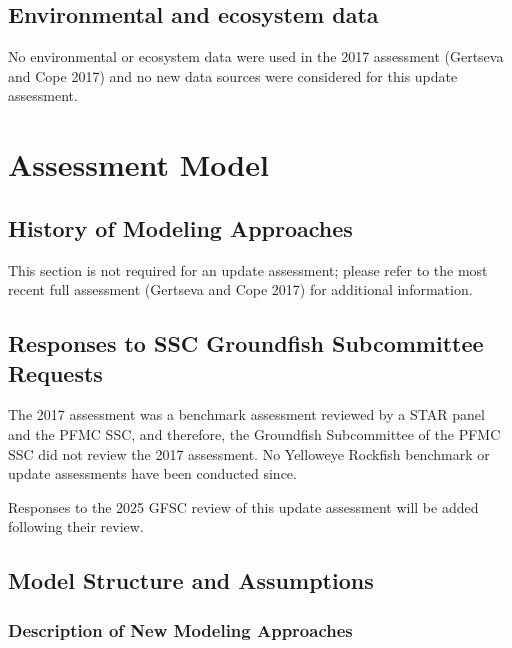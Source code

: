\documentclass[
  english,
]{article}
\begin{document}
\subsection{Environmental and ecosystem
data}\label{environmental-and-ecosystem-data}

No environmental or ecosystem data were used in the 2017 assessment
(Gertseva and Cope 2017) and no new data sources were considered for
this update assessment.

\newpage{}

\section{Assessment Model}\label{assessment-model}

\subsection{History of Modeling
Approaches}\label{history-of-modeling-approaches}

This section is not required for an update assessment; please refer to
the most recent full assessment (Gertseva and Cope 2017) for additional
information.

\subsection{Responses to SSC Groundfish Subcommittee
Requests}\label{responses-to-ssc-groundfish-subcommittee-requests}

The 2017 assessment was a benchmark assessment reviewed by a STAR panel
and the PFMC SSC, and therefore, the Groundfish Subcommittee of the PFMC
SSC did not review the 2017 assessment. No Yelloweye Rockfish benchmark
or update assessments have been conducted since.

Responses to the 2025 GFSC review of this update assessment will be
added following their review.

\subsection{Model Structure and Assumptions}\label{sec-bridge}

\subsubsection{Description of New Modeling
Approaches}\label{description-of-new-modeling-approaches}
\end{document}

